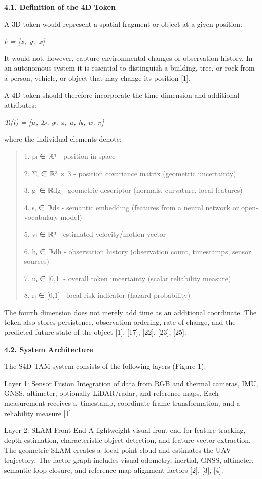 \documentclass[
]{article}
\begin{document}
\textbf{4.1. Definition of the 4D Token}

A 3D token would represent a spatial fragment or object at a given
position:

\emph{tᵢ = {[}xᵢ, yᵢ, zᵢ{]}}

It would not, however, capture environmental changes or observation
history. In an autonomous system it is essential to distinguish a
building, tree, or rock from a person, vehicle, or object that may
change its position {[}1{]}.

A 4D token should therefore incorporate the time dimension and
additional attributes:

\emph{Tᵢ(t) = {[}pᵢ, Σᵢ, gᵢ, sᵢ, vᵢ, hᵢ, uᵢ, rᵢ{]}}

where the individual elements denote:

\begin{quote}
1. pᵢ ∈ ℝ³ - position in space

2. Σᵢ ∈ ℝ³ × 3 - position covariance matrix (geometric uncertainty)

3. gᵢ ∈ ℝdg - geometric descriptor (normals, curvature, local features)

4. sᵢ ∈ ℝds - semantic embedding (features from a neural network or
open-vocabulary model)

5. vᵢ ∈ ℝ³ - estimated velocity/motion vector

6. hᵢ ∈ ℝdh - observation history (observation count, timestamps, sensor
sources)

7. uᵢ ∈ {[}0,1{]} - overall token uncertainty (scalar reliability
measure)

8. rᵢ ∈ {[}0,1{]} - local risk indicator (hazard probability)
\end{quote}

The fourth dimension does not merely add time as an additional
coordinate. The token also stores persistence, observation ordering,
rate of change, and the predicted future state of the object {[}1{]},
{[}17{]}, {[}22{]}, {[}23{]}, {[}25{]}.

\textbf{4.2. System Architecture}

The S4D-TAM system consists of the following layers (Figure 1):

Layer 1: Sensor Fusion Integration of data from RGB and thermal cameras,
IMU, GNSS, altimeter, optionally LiDAR/radar, and reference maps. Each
measurement receives a~timestamp, coordinate frame transformation, and a
reliability measure {[}1{]}.

Layer 2: SLAM Front-End A lightweight visual front-end for feature
tracking, depth estimation, characteristic object detection, and feature
vector extraction. The geometric SLAM creates a~local point cloud and
estimates the UAV trajectory. The factor graph includes visual odometry,
inertial, GNSS, altimeter, semantic loop-closure, and reference-map
alignment factors {[}2{]}, {[}3{]}, {[}4{]}.
\end{document}
